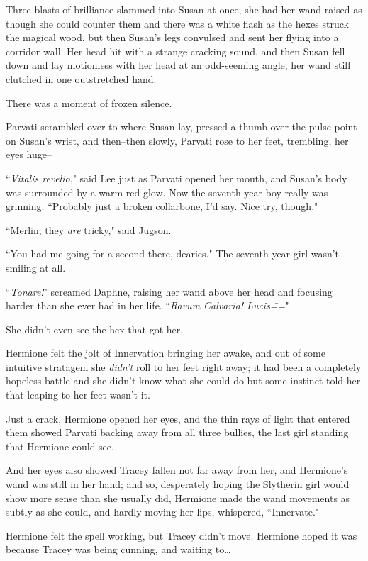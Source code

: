 Three blasts of brilliance slammed into Susan at once, she had her wand raised as though she could counter them and there was a white flash as the hexes struck the magical wood, but then Susan's legs convulsed and sent her flying into a corridor wall. Her head hit with a strange cracking sound, and then Susan fell down and lay motionless with her head at an odd-seeming angle, her wand still clutched in one outstretched hand.

There was a moment of frozen silence.

Parvati scrambled over to where Susan lay, pressed a thumb over the pulse point on Susan's wrist, and then\---then slowly, Parvati rose to her feet, trembling, her eyes huge\---

``\emph{Vitalis revelio}," said Lee just as Parvati opened her mouth, and Susan's body was surrounded by a warm red glow. Now the seventh-year boy really was grinning. ``Probably just a broken collarbone, I'd say. Nice try, though."

``Merlin, they \emph{are} tricky," said Jugson.

``You had me going for a second there, dearies." The seventh-year girl wasn't smiling at all.

``\emph{Tonare!}" screamed Daphne, raising her wand above her head and focusing harder than she ever had in her life. ``\emph{Ravum Calvaria! Lucis\===}"

She didn't even see the hex that got her.

\later

Hermione felt the jolt of Innervation bringing her awake, and out of some intuitive stratagem she \emph{didn't} roll to her feet right away; it had been a completely hopeless battle and she didn't know what she could do but some instinct told her that leaping to her feet wasn't it.

Just a crack, Hermione opened her eyes, and the thin rays of light that entered them showed Parvati backing away from all three bullies, the last girl standing that Hermione could see.

And her eyes also showed Tracey fallen not far away from her, and Hermione's wand was still in her hand; and so, desperately hoping the Slytherin girl would show more sense than she usually did, Hermione made the wand movements as subtly as she could, and hardly moving her lips, whispered, ``Innervate."

Hermione felt the spell working, but Tracey didn't move. Hermione hoped it was because Tracey was being cunning, and waiting to{\ldots}

